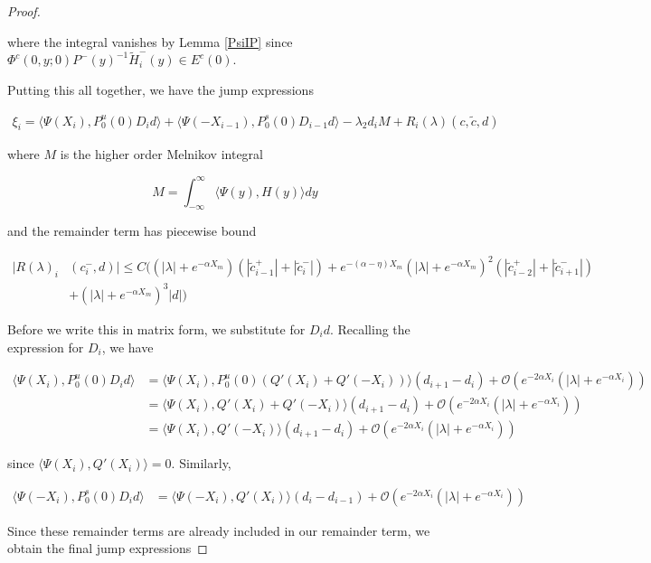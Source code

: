 \documentclass[thesis.tex]{subfiles}
\begin{document}
\begin{lemma}
\begin{proof}
\begin{enumerate}
where the integral vanishes by Lemma \ref{PsiIP} since $\Phi^c(0, y; 0) P^-(y)^{-1} \tilde{H}_i^-(y) \in E^c(0)$.

\end{enumerate}

Putting this all together, we have the jump expressions

\begin{align*}
\xi_i = \langle \Psi(X_i), P_0^u(0) D_i d \rangle
+ \langle \Psi(-X_{i-1}), P_0^s(0) D_{i-1} d \rangle 
- \lambda_2 d_i M + R_i(\lambda)(c, \tilde{c}, d)
\end{align*}

where $M$ is the higher order Melnikov integral

\[
M = \int_{-\infty}^\infty \langle \Psi(y), H(y) \rangle dy 
\]

and the remainder term has piecewise bound

\begin{align*}
|R(\lambda)_i&(c_i^-, d)| \leq C \Big( (|\lambda| + e^{-\alpha X_m})(|\tilde{c}_{i-1}^+| + |\tilde{c}_{i}^-|) + e^{-(\alpha - \eta) X_m}(|\lambda| + e^{-\alpha X_m})^2(|\tilde{c}_{i-2}^+| + |\tilde{c}_{i+1}^-|) \\
&+ (|\lambda| + e^{-\alpha X_m})^3 |d| \Big)
\end{align*}

Before we write this in matrix form, we substitute for $D_i d$. Recalling the expression for $D_i$, we have

\begin{align*}
\langle \Psi(X_i), P_0^u(0) D_i d \rangle
&= \langle \Psi(X_i), P_0^u(0) (Q'(X_i) + Q'(-X_i)) \rangle (d_{i+1} - d_i)
+\mathcal{O}(e^{-2 \alpha X_i}(|\lambda| + e^{-\alpha X_i})) \\
&= \langle \Psi(X_i), Q'(X_i) + Q'(-X_i) \rangle (d_{i+1} - d_i)
+\mathcal{O}(e^{-2 \alpha X_i}(|\lambda| + e^{-\alpha X_i})) \\
&= \langle \Psi(X_i), Q'(-X_i) \rangle (d_{i+1} - d_i)
+\mathcal{O}(e^{-2 \alpha X_i}(|\lambda| + e^{-\alpha X_i})) 
\end{align*}

since $\langle \Psi(X_i), Q'(X_i) \rangle = 0$. Similarly, 

\begin{align*}
\langle \Psi(-X_i), P_0^s(0) D_i d \rangle
&= \langle \Psi(-X_i), Q'(X_i) \rangle (d_i - d_{i-1})
+\mathcal{O}(e^{-2 \alpha X_i}(|\lambda| + e^{-\alpha X_i})) 
\end{align*}

Since these remainder terms are already included in our remainder term, we obtain the final jump expressions


\end{proof}
\end{lemma}
\end{document}
